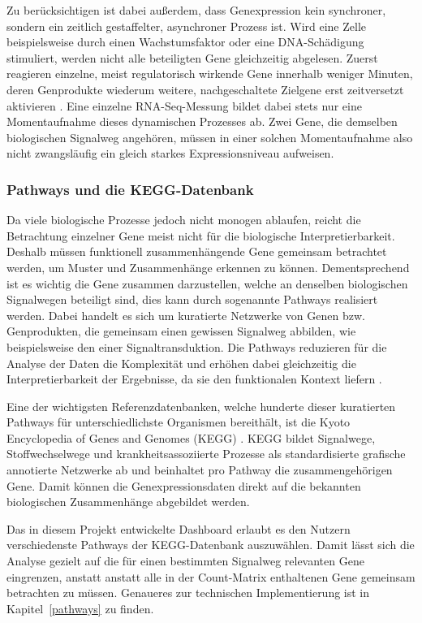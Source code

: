 \documentclass[12pt]{article}
\begin{document}
Zu berücksichtigen ist dabei außerdem, dass Genexpression kein synchroner, sondern ein zeitlich gestaffelter, asynchroner Prozess ist. Wird eine Zelle beispielsweise durch einen Wachstumsfaktor oder eine DNA-Schädigung stimuliert, werden nicht alle beteiligten Gene gleichzeitig abgelesen. Zuerst reagieren einzelne, meist regulatorisch wirkende Gene innerhalb weniger Minuten, deren Genprodukte wiederum weitere, nachgeschaltete Zielgene erst zeitversetzt aktivieren \cite{LeeYoung2013}. Eine einzelne RNA-Seq-Messung bildet dabei stets nur eine Momentaufnahme dieses dynamischen Prozesses ab. Zwei Gene, die demselben biologischen Signalweg angehören, müssen in einer solchen Momentaufnahme also nicht zwangsläufig ein gleich starkes Expressionsniveau aufweisen.


\subsubsection{Pathways und die KEGG-Datenbank}

Da viele biologische Prozesse jedoch nicht monogen ablaufen, reicht die Betrachtung einzelner Gene meist nicht für die biologische Interpretierbarkeit. Deshalb müssen funktionell zusammenhängende Gene gemeinsam betrachtet werden, um Muster und Zusammenhänge erkennen zu können. Dementsprechend ist es wichtig die Gene zusammen darzustellen, welche an denselben biologischen Signalwegen beteiligt sind, dies kann durch sogenannte Pathways realisiert werden. Dabei handelt es sich um kuratierte Netzwerke von Genen bzw. Genprodukten, die gemeinsam einen gewissen Signalweg abbilden, wie beispielsweise den einer Signaltransduktion. Die Pathways reduzieren für die Analyse der Daten die Komplexität und erhöhen dabei gleichzeitig die Interpretierbarkeit der Ergebnisse, da sie den funktionalen Kontext liefern \cite{Khatri2012}.

Eine der wichtigsten Referenzdatenbanken, welche hunderte dieser kuratierten Pathways für unterschiedlichste Organismen bereithält, ist die Kyoto Encyclopedia of Genes and Genomes (KEGG) \cite{Kanehisa2023}. KEGG bildet Signalwege, Stoffwechselwege und krankheitsassoziierte Prozesse als standardisierte grafische annotierte Netzwerke ab und beinhaltet pro Pathway die zusammengehörigen Gene. Damit können die Genexpressionsdaten direkt auf die bekannten biologischen Zusammenhänge abgebildet werden. 

Das in diesem Projekt entwickelte Dashboard erlaubt es den Nutzern verschiedenste Pathways der KEGG-Datenbank auszuwählen. Damit lässt sich die Analyse gezielt auf die für einen bestimmten Signalweg relevanten Gene eingrenzen, anstatt anstatt alle in der Count-Matrix enthaltenen Gene gemeinsam betrachten zu müssen. Genaueres zur technischen Implementierung ist in Kapitel~\ref{pathways} zu finden.
\end{document}
